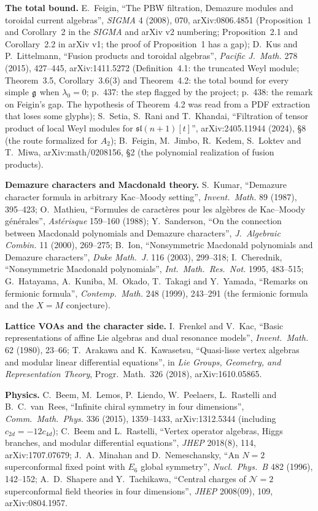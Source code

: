 \textbf{The total bound.} E.~Feigin, ``The PBW filtration, Demazure modules and toroidal current algebras'', \emph{SIGMA} 4 (2008), 070,
arXiv:0806.4851 (Proposition~1 and Corollary~2 in the \emph{SIGMA} and arXiv v2 numbering; Proposition~2.1 and Corollary~2.2 in
arXiv v1; the proof of Proposition~1 has a gap); D.~Kus and P.~Littelmann, ``Fusion products and toroidal algebras'', \emph{Pacific J.\
Math.} 278 (2015), 427--445, arXiv:1411.5272 (Definition~4.1: the truncated Weyl module; Theorem~3.5, Corollary~3.6(3) and
Theorem~4.2: the total bound for every simple $\mathfrak g$ when $\lambda_0=0$; p.~437: the step flagged by the project; p.~438:
the remark on Feigin's gap. The hypothesis of Theorem~4.2 was read from a PDF extraction that loses some glyphs); S.~Setia, S.~Rani and T.~Khandai, ``Filtration of tensor
product of local Weyl modules for $\mathfrak{sl}(n+1)[t]$'', arXiv:2405.11944 (2024), \S8 (the route formalized for $A_2$); B.~Feigin, M.~Jimbo,
R.~Kedem, S.~Loktev and T.~Miwa, arXiv:math/0208156, \S2 (the polynomial realization of fusion products).

\textbf{Demazure characters and Macdonald theory.} S.~Kumar, ``Demazure character formula in arbitrary Kac--Moody setting'', \emph{Invent.\
Math.} 89 (1987), 395--423; O.~Mathieu, ``Formules de caract\`eres pour les alg\`ebres de Kac--Moody g\'en\'erales'', \emph{Ast\'erisque}
159--160 (1988); Y.~Sanderson, ``On the connection between Macdonald polynomials and Demazure characters'', \emph{J.\ Algebraic Combin.} 11
(2000), 269--275; B.~Ion, ``Nonsymmetric Macdonald polynomials and Demazure characters'', \emph{Duke Math.\ J.} 116 (2003), 299--318;
I.~Cherednik, ``Nonsymmetric Macdonald polynomials'', \emph{Int.\ Math.\ Res.\ Not.} 1995, 483--515; G.~Hatayama, A.~Kuniba, M.~Okado,
T.~Takagi and Y.~Yamada, ``Remarks on fermionic formula'', \emph{Contemp.\ Math.} 248 (1999), 243--291 (the fermionic formula and the
$X=M$ conjecture).

\textbf{Lattice VOAs and the character side.} I.~Frenkel and V.~Kac, ``Basic representations of affine Lie algebras and dual resonance
models'', \emph{Invent.\ Math.} 62 (1980), 23--66; T.~Arakawa and K.~Kawasetsu, ``Quasi-lisse vertex algebras and modular linear
differential equations'', in \emph{Lie Groups, Geometry, and Representation Theory}, Progr.\ Math.\ 326 (2018), arXiv:1610.05865.

\textbf{Physics.} C.~Beem, M.~Lemos, P.~Liendo, W.~Peelaers, L.~Rastelli and B.~C.~van~Rees, ``Infinite chiral symmetry in four
dimensions'', \emph{Comm.\ Math.\ Phys.} 336 (2015), 1359--1433, arXiv:1312.5344 (including $c_{2d}=-12c_{4d}$); C.~Beem and L.~Rastelli,
``Vertex operator algebras, Higgs branches, and modular differential equations'', \emph{JHEP} 2018(8), 114, arXiv:1707.07679;
J.~A.~Minahan and D.~Nemeschansky, ``An $N=2$ superconformal fixed point with $E_6$ global symmetry'', \emph{Nucl.\ Phys.\ B} 482 (1996),
142--152; A.~D.~Shapere and Y.~Tachikawa, ``Central charges of $\mathcal N=2$ superconformal field theories in four dimensions'',
\emph{JHEP} 2008(09), 109, arXiv:0804.1957.

\endgroup
